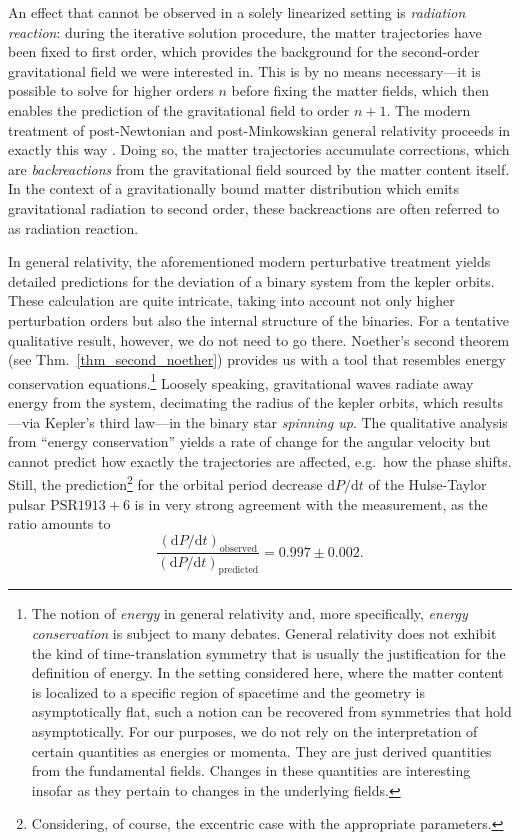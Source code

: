 An effect that cannot be observed in a solely linearized setting is \emph{radiation reaction}: during the iterative solution procedure, the matter trajectories have been fixed to first order, which provides the background for the second-order gravitational field we were interested in. This is by no means necessary---it is possible to solve for higher orders $n$ before fixing the matter fields, which then enables the prediction of the gravitational field to order $n+1$. The modern treatment of post-Newtonian and post-Minkowskian general relativity proceeds in exactly this way \cite{poisson}. Doing so, the matter trajectories accumulate corrections, which are \emph{backreactions} from the gravitational field sourced by the matter content itself. In the context of a gravitationally bound matter distribution which emits gravitational radiation to second order, these backreactions are often referred to as radiation reaction.

In general relativity, the aforementioned modern perturbative treatment yields detailed predictions for the deviation of a binary system from the kepler orbits. These calculation are quite intricate, taking into account not only higher perturbation orders but also the internal structure of the binaries. For a tentative qualitative result, however, we do not need to go there. Noether's second theorem (see Thm.~\ref{thm_second_noether}) provides us with a tool that resembles energy conservation equations.\footnote{The notion of \emph{energy} in general relativity and, more specifically, \emph{energy conservation} is subject to many debates. General relativity does not exhibit the kind of time-translation symmetry that is usually the justification for the definition of energy. In the setting considered here, where the matter content is localized to a specific region of spacetime and the geometry is asymptotically flat, such a notion can be recovered from symmetries that hold asymptotically. \cite{} For our purposes, we do not rely on the interpretation of certain quantities as energies or momenta. They are just derived quantities from the fundamental fields. Changes in these quantities are interesting insofar as they pertain to changes in the underlying fields.} Loosely speaking, gravitational waves radiate away energy from the system, decimating the radius of the kepler orbits, which results---via Kepler's third law---in the binary star \emph{spinning up}. The qualitative analysis from ``energy conservation'' yields a rate of change for the angular velocity but cannot predict how exactly the trajectories are affected, e.g.~how the phase shifts. Still, the prediction\footnote{Considering, of course, the excentric case with the appropriate parameters.} for the orbital period decrease $\mathrm dP/\mathrm dt$ of the Hulse-Taylor pulsar $\text{PSR} 1913+6$ is in very strong agreement with the measurement, as the ratio amounts to \cite{poisson}
\begin{equation}
  \frac{(\mathrm dP/\mathrm dt)_\text{observed}}{(\mathrm dP/\mathrm dt)_\text{predicted}} = 0.997 \pm 0.002.
\end{equation}

